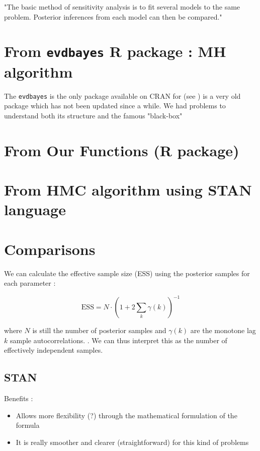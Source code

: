 \documentclass[11pt,a4paper,openany ]{book}
\begin{document}
"The basic method of sensitivity analysis is to fit several models to
the same problem. Posterior inferences from each model can then be compared."


\section{From \texttt{evdbayes} R package : MH algorithm}

The \texttt{evdbayes} is the only package available on CRAN for (see \citet{ribatet_users_2006}) is a very old package which has not been updated since a while. We had problems to understand both its structure and the famous "black-box"


\section{From Our Functions (R package)}



\section{From HMC algorithm using STAN language}




\section{Comparisons}

\citet{hartmann_bayesian_2016}
We can calculate the effective sample size (ESS) using the posterior samples for each parameter : 

\begin{equation}
\text{ESS}=N\cdot (1+2\sum_k\gamma(k))^{-1}
\end{equation}

where $N$ is still the number of posterior samples and $\gamma(k)$ are the monotone lag $k$ sample autocorrelations. \citet{geyer__1992}. We can thus interpret this as the number of effectively independent samples. 


\subsection{STAN}

Benefits : 

\begin{itemize}
	\item Allows more flexibility (?) through the mathematical formulation of the formula
	\item It is really smoother and clearer (straightforward) for this kind of problems 
\end{itemize}
\end{document}
